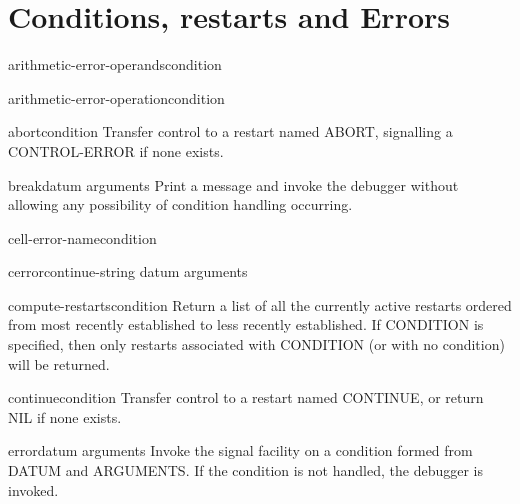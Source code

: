 \chapter{Conditions, restarts and Errors}

\begin{function}{arithmetic-error-operands}{condition}{}{}
  
\end{function}

\begin{function}{arithmetic-error-operation}{condition}{}{}
  
\end{function}

\begin{function}{abort}{\op condition}{}{}
  Transfer control to a restart named ABORT, signalling a CONTROL-ERROR if
   none exists.
\end{function}

\begin{function}{break}{\op datum \rest arguments}{}{}
  Print a message and invoke the debugger without allowing any possibility
   of condition handling occurring.
\end{function}

\begin{function}{cell-error-name}{condition}{}{}
  
\end{function}

\begin{function}{cerror}{continue-string datum \rest arguments}{}{}
  
\end{function}

\begin{function}{compute-restarts}{\op condition}{}{}
  Return a list of all the currently active restarts ordered from most recently
established to less recently established. If CONDITION is specified, then only
restarts associated with CONDITION (or with no condition) will be returned.
\end{function}

\begin{function}{continue}{\op condition}{}{}
  Transfer control to a restart named CONTINUE, or return NIL if none exists.
\end{function}

\begin{function}{error}{datum \rest arguments}{}{}
  Invoke the signal facility on a condition formed from DATUM and ARGUMENTS.
  If the condition is not handled, the debugger is invoked.
\end{function}

